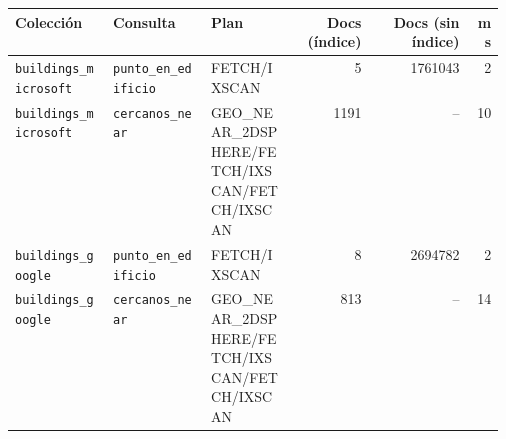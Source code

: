 \begin{tabular}{p{0.2\linewidth}p{0.2\linewidth}p{0.17\linewidth}rrr}
\toprule
Colección & Consulta & Plan & Docs (índice) & Docs (sin índice) & ms \\
\midrule
\texttt{buildings\_microsoft} & \texttt{punto\_en\_edificio} & FETCH/IXSCAN & 5 & 1761043 & 2 \\
\texttt{buildings\_microsoft} & \texttt{cercanos\_near} & GEO\_NEAR\_2DSPHERE/FETCH/IXSCAN/FETCH/IXSCAN & 1191 & -- & 10 \\
\texttt{buildings\_google} & \texttt{punto\_en\_edificio} & FETCH/IXSCAN & 8 & 2694782 & 2 \\
\texttt{buildings\_google} & \texttt{cercanos\_near} & GEO\_NEAR\_2DSPHERE/FETCH/IXSCAN/FETCH/IXSCAN & 813 & -- & 14 \\
\bottomrule
\end{tabular}
